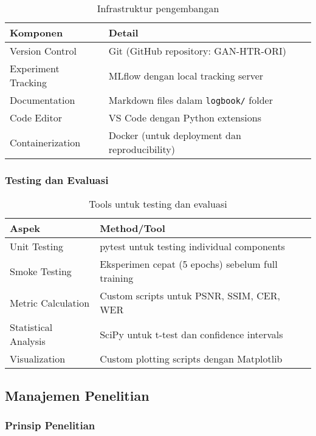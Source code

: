 \documentclass[12pt,a4paper]{article}
\begin{document}
\begin{table}[H]
\centering
\caption{Infrastruktur pengembangan}
\label{tab:infrastructure}
\small
\begin{tabular}{|l|l|}
\hline
\textbf{Komponen} & \textbf{Detail} \\ \hline
Version Control & Git (GitHub repository: GAN-HTR-ORI) \\ \hline
Experiment Tracking & MLflow dengan local tracking server \\ \hline
Documentation & Markdown files dalam \texttt{logbook/} folder \\ \hline
Code Editor & VS Code dengan Python extensions \\ \hline
Containerization & Docker (untuk deployment dan reproducibility) \\ \hline
\end{tabular}
\end{table}

\subsubsection{Testing dan Evaluasi}
\label{subsubsec:testing}

\begin{table}[H]
\centering
\caption{Tools untuk testing dan evaluasi}
\label{tab:testing-tools}
\small
\begin{tabular}{|l|l|}
\hline
\textbf{Aspek} & \textbf{Method/Tool} \\ \hline
Unit Testing & pytest untuk testing individual components \\ \hline
Smoke Testing & Eksperimen cepat (5 epochs) sebelum full training \\ \hline
Metric Calculation & Custom scripts untuk PSNR, SSIM, CER, WER \\ \hline
Statistical Analysis & SciPy untuk t-test dan confidence intervals \\ \hline
Visualization & Custom plotting scripts dengan Matplotlib \\ \hline
\end{tabular}
\end{table}

\subsection{Manajemen Penelitian}
\label{subsec:research-management}

\subsubsection{Prinsip Penelitian}
\label{subsubsec:research-principles}
\end{document}
